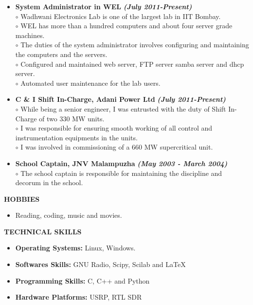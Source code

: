\documentclass[a4paper,10pt]{article}
\begin{document}
 \begin{itemize}
 \setlength{\itemsep}{1pt}
 \item \textbf{System Administrator in WEL} \textbf \emph{(July 2011-Present)} \\
$\circ$ Wadhwani Electronics Lab is one of the largest lab in IIT Bombay. \\
$\circ$ WEL has more than a hundred computers and about four server grade machines. \\ 
$\circ$ The duties of the system administrator involves configuring and maintaining the computers and the servers. \\
$\circ$ Configured and maintained web server, FTP server samba server and dhcp server. \\
$\circ$ Automated user maintenance for the lab users.

\item \textbf{C \& I Shift In-Charge, Adani Power Ltd} \textbf \emph{(July 2011-Present)} \\
$\circ$ While being a senior engineer, I was entrusted with the duty of Shift In-Charge of two 330 MW units. \\
$\circ$ I was responsible for ensuring smooth working of all control and instrumentation equipments in the units. \\
$\circ$ I was involved in commissioning of a 660 MW supercritical unit.

\item \textbf{School Captain, JNV Malampuzha} \textbf \emph{(May 2003 - March 2004)} \\
$\circ$ The school captain is responsible for maintaining the discipline and decorum in the school.
 \end{itemize}

 \colorbox{titleColor}{\parbox{6.5in}{\textbf{HOBBIES}}}

  \begin{itemize}
 \setlength{\itemsep}{1pt}
    \item Reading, coding, music and movies.
  \end{itemize}
  
 \colorbox{titleColor}{\parbox{6.5in}{\textbf{TECHNICAL SKILLS}}}
 
 \begin{itemize}
 \setlength{\itemsep}{1pt}
 \item \textbf{{Operating Systems:}} Linux, Windows.
 \item \textbf{{Softwares Skills:}} GNU Radio, Scipy, Scilab and \LaTeX
 \item \textbf{{Programming Skills:}} C, C++ and Python
 \item \textbf{{Hardware Platforms:}} USRP, RTL SDR
 \end{itemize}
 
\end{document}
